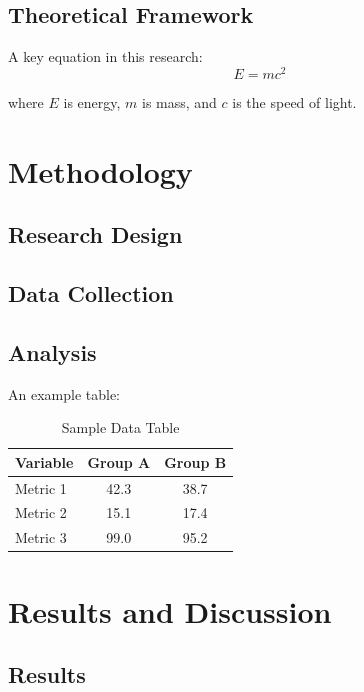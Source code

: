 \documentclass[12pt, a4paper]{report}
\begin{document}
\lipsum[3-4]

\section{Theoretical Framework}
A key equation in this research:
\begin{equation}
    E = mc^2
\end{equation}

where $E$ is energy, $m$ is mass, and $c$ is the speed of light.

\chapter{Methodology}

\section{Research Design}
\lipsum[5]

\section{Data Collection}
\lipsum[6]

\section{Analysis}
An example table:

\begin{table}[h]
    \centering
    \caption{Sample Data Table}
    \begin{tabular}{lcc}
        \toprule
        Variable & Group A & Group B \\
        \midrule
        Metric 1 & 42.3 & 38.7 \\
        Metric 2 & 15.1 & 17.4 \\
        Metric 3 & 99.0 & 95.2 \\
        \bottomrule
    \end{tabular}
    \label{tab:sample}
\end{table}

\chapter{Results and Discussion}

\section{Results}
\lipsum[7]
\end{document}
